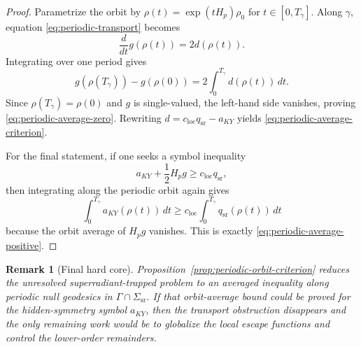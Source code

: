 \documentclass[12pt,a4paper]{article}
\newtheorem{remark}[theorem]{Remark}
\begin{document}
\begin{proof}
Parametrize the orbit by $\rho(t)=\exp(tH_p)\rho_0$ for $t\in[0,T_\gamma]$. Along $\gamma$, equation \eqref{eq:periodic-transport} becomes
\begin{equation}
\frac{d}{dt} g(\rho(t)) = 2d(\rho(t)).
\end{equation}
Integrating over one period gives
\begin{equation}
g(\rho(T_\gamma)) - g(\rho(0)) = 2\int_0^{T_\gamma} d(\rho(t))\,dt.
\end{equation}
Since $\rho(T_\gamma)=\rho(0)$ and $g$ is single-valued, the left-hand side vanishes, proving \eqref{eq:periodic-average-zero}. Rewriting $d=c_{\mathrm{loc}}q_{\mathrm{sr}}-a_{KY}$ yields \eqref{eq:periodic-average-criterion}.

For the final statement, if one seeks a symbol inequality
\begin{equation}
a_{KY} + \frac12 H_p g \ge c_{\mathrm{loc}} q_{\mathrm{sr}},
\end{equation}
then integrating along the periodic orbit again gives
\begin{equation}
\int_0^{T_\gamma} a_{KY}(\rho(t))\,dt
\ge
c_{\mathrm{loc}} \int_0^{T_\gamma} q_{\mathrm{sr}}(\rho(t))\,dt
\end{equation}
because the orbit average of $H_p g$ vanishes. This is exactly \eqref{eq:periodic-average-positive}.
\end{proof}

\begin{remark}[Final hard core]
Proposition~\ref{prop:periodic-orbit-criterion} reduces the unresolved superradiant-trapped problem to an averaged inequality along periodic null geodesics in $\Gamma \cap \Sigma_{\mathrm{sr}}$. If that orbit-average bound could be proved for the hidden-symmetry symbol $a_{KY}$, then the transport obstruction disappears and the only remaining work would be to globalize the local escape functions and control the lower-order remainders.
\end{remark}
\end{document}
